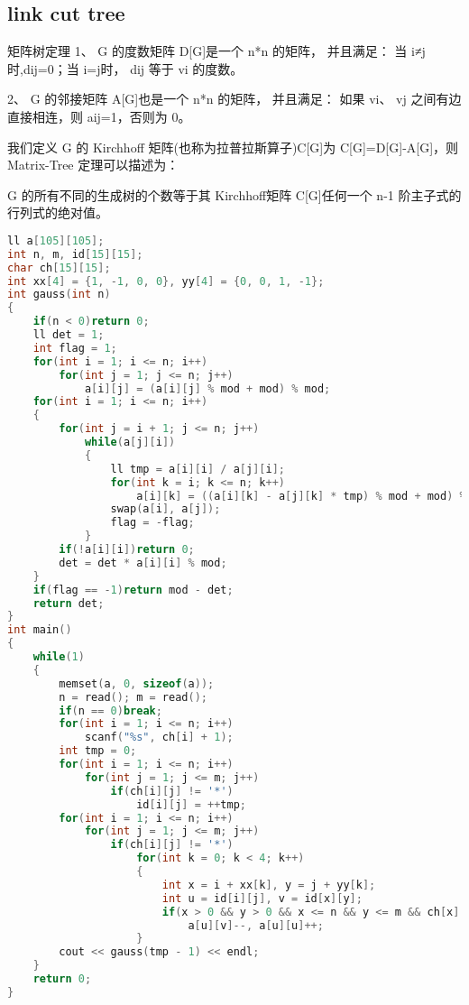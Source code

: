 \subsection{link cut tree}
矩阵树定理
1、 G 的度数矩阵 D[G]是一个 n*n 的矩阵， 并且满足： 当 i≠j 时,dij=0；当 i=j时， dij 等于 vi 的度数。

2、 G 的邻接矩阵 A[G]也是一个 n*n 的矩阵， 并且满足： 如果 vi、 vj 之间有边直接相连，则 aij=1，否则为 0。 

我们定义 G 的 Kirchhoff 矩阵(也称为拉普拉斯算子)C[G]为 C[G]=D[G]-A[G]，则 Matrix-Tree 定理可以描述为：

G 的所有不同的生成树的个数等于其 Kirchhoff矩阵 C[G]任何一个 n-1 阶主子式的行列式的绝对值。
\begin{lstlisting}[language=C]
ll a[105][105];
int n, m, id[15][15];
char ch[15][15];
int xx[4] = {1, -1, 0, 0}, yy[4] = {0, 0, 1, -1};
int gauss(int n)
{
    if(n < 0)return 0;
    ll det = 1;
    int flag = 1;
    for(int i = 1; i <= n; i++)
        for(int j = 1; j <= n; j++)
            a[i][j] = (a[i][j] % mod + mod) % mod;
    for(int i = 1; i <= n; i++)
    {
        for(int j = i + 1; j <= n; j++)
            while(a[j][i])
            {
                ll tmp = a[i][i] / a[j][i];
                for(int k = i; k <= n; k++)
                    a[i][k] = ((a[i][k] - a[j][k] * tmp) % mod + mod) % mod;
                swap(a[i], a[j]);
                flag = -flag;
            }        
        if(!a[i][i])return 0;
        det = det * a[i][i] % mod;
    }
    if(flag == -1)return mod - det;
    return det;
}
int main()
{
    while(1)
    {
        memset(a, 0, sizeof(a));
        n = read(); m = read();
        if(n == 0)break;
        for(int i = 1; i <= n; i++)
            scanf("%s", ch[i] + 1);
        int tmp = 0;
        for(int i = 1; i <= n; i++)
            for(int j = 1; j <= m; j++)
                if(ch[i][j] != '*')
                    id[i][j] = ++tmp;
        for(int i = 1; i <= n; i++)
            for(int j = 1; j <= m; j++)
                if(ch[i][j] != '*')
                    for(int k = 0; k < 4; k++)
                    {
                        int x = i + xx[k], y = j + yy[k];
                        int u = id[i][j], v = id[x][y];
                        if(x > 0 && y > 0 && x <= n && y <= m && ch[x][y] != '*')
                            a[u][v]--, a[u][u]++;
                    }
        cout << gauss(tmp - 1) << endl;
    }
    return 0;
}
\end{lstlisting} 
